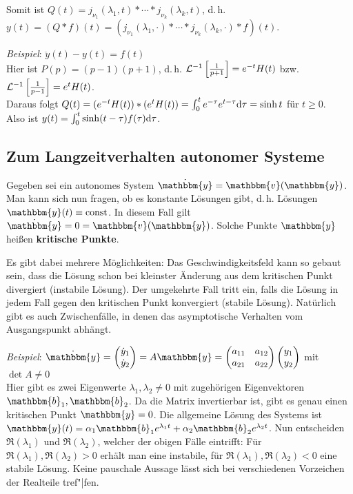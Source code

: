 Somit ist $Q(t) = j_{\nu_1}(\lambda_1, t) \ast \dotsm
\ast j_{\nu_k}(\lambda_k, t)$, d.\,h. \\
$y(t) = (Q \ast f)(t) =
(j_{\nu_1}(\lambda_1, \cdot) \ast \dotsb
\ast j_{\nu_k}(\lambda_k, \cdot) \ast f)(t)$.

\emph{Beispiel}:
$\ddot{y}(t) - y(t) = f(t)$ \\
Hier ist $P(p) = (p - 1)(p + 1)$,
d.\,h. $\mathcal{L}^{-1}\left[\frac{1}{p+1}\right] = e^{-t} H(t)$ bzw.
$\mathcal{L}^{-1}\left[\frac{1}{p-1}\right] = e^t H(t)$. \\
Daraus folgt $Q(t) = (e^{-t} H(t)) \ast (e^t H(t)) =
\int_0^t e^{-\tau} e^{t - \tau} \mathrm{d}\tau = \sinh t$ für $t \ge 0$. \\
Also ist $y(t) = \int_0^t \sinh(t - \tau) f(\tau) \mathrm{d}\tau$.

\subsection{%
    Zum Langzeitverhalten autonomer Systeme%
}

Gegeben sei ein autonomes System
$\dot{\mathbbm{y}} = \mathbbm{v}(\mathbbm{y})$.
Man kann sich nun fragen, ob es konstante Lösungen gibt, d.\,h.
Lösungen $\mathbbm{y}(t) \equiv \const$.
In diesem Fall gilt $\dot{\mathbbm{y}} = 0 = \mathbbm{v}(\mathbbm{y})$.
Solche Punkte $\mathbbm{y}$ heißen \textbf{kritische Punkte}.

Es gibt dabei mehrere Möglichkeiten:
Das Geschwindigkeitsfeld kann so gebaut sein, dass die Lösung schon bei
kleinster Änderung aus dem kritischen Punkt divergiert (instabile Lösung).
Der umgekehrte Fall tritt ein, falls die Lösung in jedem Fall gegen den
kritischen Punkt konvergiert (stabile Lösung).
Natürlich gibt es auch Zwischenfälle, in denen das asymptotische Verhalten
vom Ausgangspunkt abhängt.

\emph{Beispiel}:
$\dot{\mathbbm{y}} = \begin{pmatrix}\dot{y}_1 \\ \dot{y}_2\end{pmatrix} =
A\mathbbm{y} = \begin{pmatrix}a_{11} & a_{12} \\ a_{21} & a_{22}\end{pmatrix}
\begin{pmatrix}y_1 \\ y_2\end{pmatrix}$ mit $\det A \not= 0$ \\
Hier gibt es zwei Eigenwerte $\lambda_1, \lambda_2 \not= 0$ mit zugehörigen
Eigenvektoren $\mathbbm{b}_1, \mathbbm{b}_2$.
Da die Matrix invertierbar ist, gibt es genau einen kritischen Punkt
$\mathbbm{y} = 0$.
Die allgemeine Lösung des Systems ist
$\mathbbm{y}(t) = \alpha_1 \mathbbm{b}_1 e^{\lambda_1 t} +
\alpha_2 \mathbbm{b}_2 e^{\lambda_2 t}$.
Nun entscheiden $\Re(\lambda_1)$ und $\Re(\lambda_2)$, welcher der obigen
Fälle eintrifft:
Für $\Re(\lambda_1), \Re(\lambda_2) > 0$ erhält man eine instabile,
für $\Re(\lambda_1), \Re(\lambda_2) < 0$ eine stabile Lösung.
Keine pauschale Aussage lässt sich bei verschiedenen Vorzeichen der Realteile
tref"|fen.

